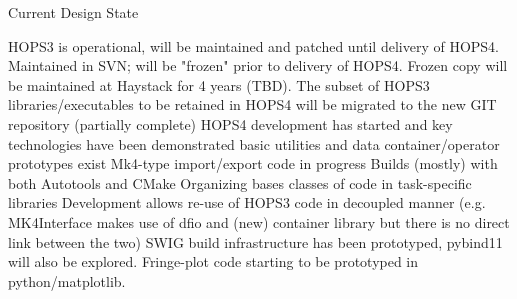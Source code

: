 \documentclass[8pt]{beamer}
\begin{document}
\begin{frame}{Current Design State}


    \begin{outline}
    \1 HOPS3 is operational, will be maintained and patched until delivery of HOPS4.
        \2 Maintained in SVN; will be "frozen" prior to delivery of HOPS4. Frozen copy will be maintained at Haystack for 4 years (TBD).
        \2 The subset of HOPS3 libraries/executables to be retained in HOPS4 will be migrated to the new GIT repository (partially complete)
    \1 HOPS4 development has started and key technologies have been demonstrated
        \2 basic utilities and data container/operator prototypes exist
        \2 Mk4-type import/export code in progress 
        \2 Builds (mostly) with both Autotools and CMake
        \2 Organizing bases classes of code in task-specific libraries
        \2 Development allows re-use of HOPS3 code in decoupled manner (e.g. MK4Interface makes use of dfio and (new) container library but there is no direct link between the two)
        \2 SWIG build infrastructure has been prototyped, pybind11 will also be explored.
        \2 Fringe-plot code starting to be prototyped in python/matplotlib.
    \end{outline}
\end{frame}
\end{document}

